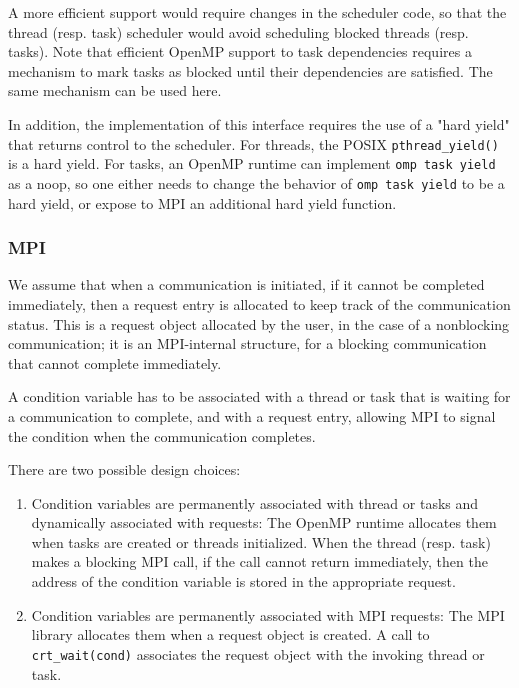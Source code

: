 A more efficient support would require changes in the scheduler code, 
so that the thread (resp. task) scheduler would avoid scheduling blocked 
threads (resp. tasks). Note that efficient OpenMP support to task dependencies 
requires a mechanism to mark tasks as blocked until their dependencies are 
satisfied. The same mechanism can be used here.

In addition, the implementation of this interface requires the use of a "hard 
yield" that returns control to the scheduler.  For threads, the POSIX 
\texttt{pthread\_yield()} is a hard yield. For tasks, an OpenMP runtime can 
implement \texttt{omp task yield} as a noop, so one either needs to change the 
behavior of \texttt{omp task yield} to be a hard yield, or expose to MPI an 
additional hard yield function.  

\subsubsection{MPI}

We assume that when a communication is initiated, if it cannot be completed 
immediately, then a request entry is allocated to keep track of the 
communication 
status. This is a request object allocated by the user, in the case of a 
nonblocking communication; it is an MPI-internal structure, for a blocking 
communication that cannot complete immediately.

A condition variable has to be associated with a thread or task that is waiting 
for a communication to complete, and with a request entry, allowing MPI to 
signal the condition when the communication completes.

There are two possible design choices:
\begin{enumerate}
	\item 
	Condition variables are permanently associated with thread or tasks and 
	dynamically associated with requests: The OpenMP 
	runtime allocates them when tasks are created or threads initialized.
	When the thread (resp. task) makes a blocking MPI call, if the call cannot 
	return immediately, then the address of the condition variable is stored in 
	the appropriate request.
	\item 
	Condition variables are permanently associated with MPI requests: The MPI 
	library 
	allocates them when a request object is created. A call to 
	\texttt{crt\_wait(cond)} associates the request object with the invoking 
	thread or task.
\end{enumerate}

